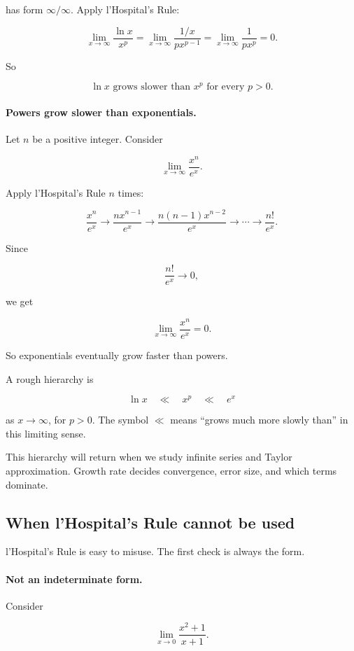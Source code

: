 has form \(\infty/\infty\).  Apply l'Hospital's Rule:

\[
\lim_{x\to\infty}\frac{\ln x}{x^p}
=
\lim_{x\to\infty}\frac{1/x}{p x^{p-1}}
=
\lim_{x\to\infty}\frac1{p x^p}
=
0.
\]

So

\[
\boxed{
\ln x \text{ grows slower than } x^p \text{ for every } p>0.
}
\]

\paragraph{Powers grow slower than exponentials.}
Let \(n\) be a positive integer.  Consider

\[
\lim_{x\to\infty}\frac{x^n}{e^x}.
\]

Apply l'Hospital's Rule \(n\) times:

\[
\frac{x^n}{e^x}
\longrightarrow
\frac{n x^{n-1}}{e^x}
\longrightarrow
\frac{n(n-1)x^{n-2}}{e^x}
\longrightarrow
\cdots
\longrightarrow
\frac{n!}{e^x}.
\]

Since

\[
\frac{n!}{e^x}\to0,
\]

we get

\[
\boxed{
\lim_{x\to\infty}\frac{x^n}{e^x}=0.
}
\]

So exponentials eventually grow faster than powers.

A rough hierarchy is

\[
\ln x
\quad\ll\quad
x^p
\quad\ll\quad
e^x
\]

as \(x\to\infty\), for \(p>0\).  The symbol \(\ll\) means ``grows much more slowly
than'' in this limiting sense.

This hierarchy will return when we study infinite series and Taylor approximation.
Growth rate decides convergence, error size, and which terms dominate.

\subsection{When l'Hospital's Rule cannot be used}
\label{subsec:lhospital-cannot-be-used}

l'Hospital's Rule is easy to misuse.  The first check is always the form.

\paragraph{Not an indeterminate form.}
Consider

\[
\lim_{x\to0}\frac{x^2+1}{x+1}.
\]

